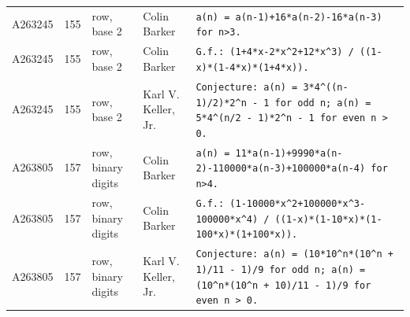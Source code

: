 \documentclass[11pt]{article}
\theoremstyle{definition}
\theoremstyle{remark}
\begin{document}
{\begin{longtable}{p{1.3cm}p{0.7cm}p{2.4cm}p{2.3cm}p{7.3cm}}
A263245 & 155 & row, base 2 & Colin Barker & \texttt{a(n)\allowbreak{} \allowbreak{}=\allowbreak{} \allowbreak{}a(n-\allowbreak{}1)\allowbreak{}+\allowbreak{}16*\allowbreak{}a(n-\allowbreak{}2)\allowbreak{}-\allowbreak{}16*\allowbreak{}a(n-\allowbreak{}3)\allowbreak{} \allowbreak{}for \allowbreak{}n>3.} \\
A263245 & 155 & row, base 2 & Colin Barker & \texttt{G.f.: \allowbreak{}(1+\allowbreak{}4*\allowbreak{}x-\allowbreak{}2*\allowbreak{}x\^{}2+\allowbreak{}12*\allowbreak{}x\^{}3)\allowbreak{} \allowbreak{}/\allowbreak{} \allowbreak{}((1-\allowbreak{}x)\allowbreak{}*\allowbreak{}(1-\allowbreak{}4*\allowbreak{}x)\allowbreak{}*\allowbreak{}(1+\allowbreak{}4*\allowbreak{}x)\allowbreak{})\allowbreak{}.} \\
A263245 & 155 & row, base 2 & Karl V. Keller, Jr. & \texttt{Conjecture: \allowbreak{}a(n)\allowbreak{} \allowbreak{}=\allowbreak{} \allowbreak{}3*\allowbreak{}4\^{}((n-\allowbreak{}1)\allowbreak{}/\allowbreak{}2)\allowbreak{}*\allowbreak{}2\^{}n \allowbreak{}-\allowbreak{} \allowbreak{}1 \allowbreak{}for \allowbreak{}odd \allowbreak{}n; \allowbreak{}a(n)\allowbreak{} \allowbreak{}=\allowbreak{} \allowbreak{}5*\allowbreak{}4\^{}(n/\allowbreak{}2 \allowbreak{}-\allowbreak{} \allowbreak{}1)\allowbreak{}*\allowbreak{}2\^{}n \allowbreak{}-\allowbreak{} \allowbreak{}1 \allowbreak{}for \allowbreak{}even \allowbreak{}n \allowbreak{}> \allowbreak{}0.} \\
A263805 & 157 & row, binary digits & Colin Barker & \texttt{a(n)\allowbreak{} \allowbreak{}=\allowbreak{} \allowbreak{}11*\allowbreak{}a(n-\allowbreak{}1)\allowbreak{}+\allowbreak{}9990*\allowbreak{}a(n-\allowbreak{}2)\allowbreak{}-\allowbreak{}110000*\allowbreak{}a(n-\allowbreak{}3)\allowbreak{}+\allowbreak{}100000*\allowbreak{}a(n-\allowbreak{}4)\allowbreak{} \allowbreak{}for \allowbreak{}n>4.} \\
A263805 & 157 & row, binary digits & Colin Barker & \texttt{G.f.: \allowbreak{}(1-\allowbreak{}10000*\allowbreak{}x\^{}2+\allowbreak{}100000*\allowbreak{}x\^{}3-\allowbreak{}100000*\allowbreak{}x\^{}4)\allowbreak{} \allowbreak{}/\allowbreak{} \allowbreak{}((1-\allowbreak{}x)\allowbreak{}*\allowbreak{}(1-\allowbreak{}10*\allowbreak{}x)\allowbreak{}*\allowbreak{}(1-\allowbreak{}100*\allowbreak{}x)\allowbreak{}*\allowbreak{}(1+\allowbreak{}100*\allowbreak{}x)\allowbreak{})\allowbreak{}.} \\
A263805 & 157 & row, binary digits & Karl V. Keller, Jr. & \texttt{Conjecture: \allowbreak{}a(n)\allowbreak{} \allowbreak{}=\allowbreak{} \allowbreak{}(10*\allowbreak{}10\^{}n*\allowbreak{}(10\^{}n \allowbreak{}+\allowbreak{} \allowbreak{}1)\allowbreak{}/\allowbreak{}11 \allowbreak{}-\allowbreak{} \allowbreak{}1)\allowbreak{}/\allowbreak{}9 \allowbreak{}for \allowbreak{}odd \allowbreak{}n; \allowbreak{}a(n)\allowbreak{} \allowbreak{}=\allowbreak{} \allowbreak{}(10\^{}n*\allowbreak{}(10\^{}n \allowbreak{}+\allowbreak{} \allowbreak{}10)\allowbreak{}/\allowbreak{}11 \allowbreak{}-\allowbreak{} \allowbreak{}1)\allowbreak{}/\allowbreak{}9 \allowbreak{}for \allowbreak{}even \allowbreak{}n \allowbreak{}> \allowbreak{}0.} \\

\end{longtable}}
\end{document}

